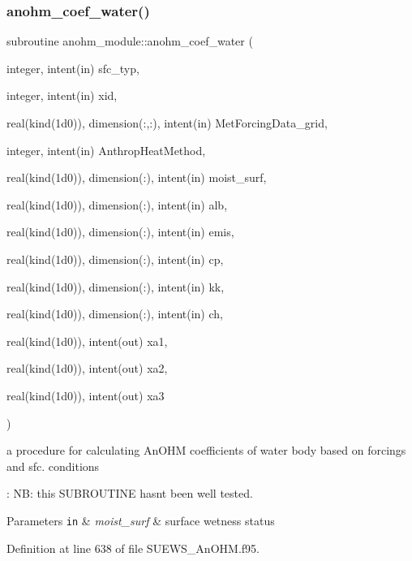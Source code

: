 \subsubsection{\texorpdfstring{anohm\+\_\+coef\+\_\+water()}{anohm\_coef\_water()}}
{\footnotesize\ttfamily subroutine anohm\+\_\+module\+::anohm\+\_\+coef\+\_\+water (\begin{DoxyParamCaption}\item[{integer, intent(in)}]{sfc\+\_\+typ,  }\item[{integer, intent(in)}]{xid,  }\item[{real(kind(1d0)), dimension(\+:,\+:), intent(in)}]{Met\+Forcing\+Data\+\_\+grid,  }\item[{integer, intent(in)}]{Anthrop\+Heat\+Method,  }\item[{real(kind(1d0)), dimension(\+:), intent(in)}]{moist\+\_\+surf,  }\item[{real(kind(1d0)), dimension(\+:), intent(in)}]{alb,  }\item[{real(kind(1d0)), dimension(\+:), intent(in)}]{emis,  }\item[{real(kind(1d0)), dimension(\+:), intent(in)}]{cp,  }\item[{real(kind(1d0)), dimension(\+:), intent(in)}]{kk,  }\item[{real(kind(1d0)), dimension(\+:), intent(in)}]{ch,  }\item[{real(kind(1d0)), intent(out)}]{xa1,  }\item[{real(kind(1d0)), intent(out)}]{xa2,  }\item[{real(kind(1d0)), intent(out)}]{xa3 }\end{DoxyParamCaption})}



a procedure for calculating An\+O\+HM coefficients of water body based on forcings and sfc. conditions 

\+: NB\+: this S\+U\+B\+R\+O\+U\+T\+I\+NE hasn\textquotesingle{}t been well tested.


\begin{DoxyParams}[1]{Parameters}
\mbox{\tt in}  & {\em moist\+\_\+surf} & surface wetness status \\
\hline
\end{DoxyParams}


Definition at line 638 of file S\+U\+E\+W\+S\+\_\+\+An\+O\+H\+M.\+f95.

